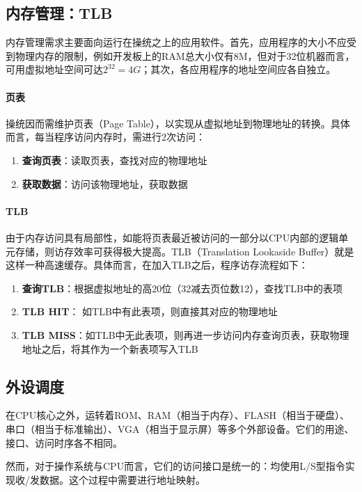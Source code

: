 \subsection{内存管理：TLB}

内存管理需求主要面向运行在操统之上的应用软件。首先，应用程序的大小不应受到物理内存的限制，例如开发板上的RAM总大小仅有8M，但对于32位机器而言，可用虚拟地址空间可达$2^{32} = 4G$；其次，各应用程序的地址空间应各自独立。

\paragraph{页表}
操统因而需维护页表（Page Table），以实现从虚拟地址到物理地址的转换。具体而言，每当程序访问内存时，需进行2次访问：
\begin{enumerate}
    \item {\bf 查询页表}：读取页表，查找对应的物理地址
    \item {\bf 获取数据}：访问该物理地址，获取数据
\end{enumerate}


\paragraph{TLB}
由于内存访问具有局部性，如能将页表最近被访问的一部分以CPU内部的逻辑单元存储，则访存效率可获得极大提高。TLB（Translation Lookaside Buffer）就是这样一种高速缓存。具体而言，在加入TLB之后，程序访存流程如下：

\begin{enumerate}
    \item {\bf 查询TLB}：根据虚拟地址的高20位（32减去页位数12），查找TLB中的表项
    \item {\bf TLB HIT}： 如TLB中有此表项，则直接其对应的物理地址
    \item {\bf TLB MISS}：如TLB中无此表项，则再进一步访问内存查询页表，获取物理地址之后，将其作为一个新表项写入TLB
\end{enumerate}

\subsection{外设调度}

在CPU核心之外，运转着ROM、RAM（相当于内存）、FLASH（相当于硬盘）、串口（相当于标准输出）、VGA（相当于显示屏）等多个外部设备。它们的用途、接口、访问时序各不相同。

然而，对于操作系统与CPU而言，它们的访问接口是统一的：均使用L/S型指令实现收/发数据。这个过程中需要进行地址映射。


